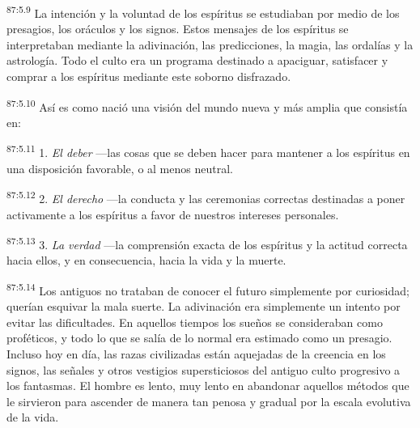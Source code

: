 \documentclass[twoside, 11pt]{book}
\begin{document}
\par
\textsuperscript{87:5.9} La intención y la voluntad de los espíritus se estudiaban por medio de los presagios, los oráculos y los signos. Estos mensajes de los espíritus se interpretaban mediante la adivinación, las predicciones, la magia, las ordalías y la astrología. Todo el culto era un programa destinado a apaciguar, satisfacer y comprar a los espíritus mediante este soborno disfrazado.

\par
\textsuperscript{87:5.10} Así es como nació una visión del mundo nueva y más amplia que consistía en:

\par
\textsuperscript{87:5.11} 1. \textit{El deber} ---las cosas que se deben hacer para mantener a los espíritus en una disposición favorable, o al menos neutral.

\par
\textsuperscript{87:5.12} 2. \textit{El derecho} ---la conducta y las ceremonias correctas destinadas a poner activamente a los espíritus a favor de nuestros intereses personales.

\par
\textsuperscript{87:5.13} 3. \textit{La verdad} ---la comprensión exacta de los espíritus y la actitud correcta hacia ellos, y en consecuencia, hacia la vida y la muerte.

\par
\textsuperscript{87:5.14} Los antiguos no trataban de conocer el futuro simplemente por curiosidad; querían esquivar la mala suerte. La adivinación era simplemente un intento por evitar las dificultades. En aquellos tiempos los sueños se consideraban como proféticos, y todo lo que se salía de lo normal era estimado como un presagio. Incluso hoy en día, las razas civilizadas están aquejadas de la creencia en los signos, las señales y otros vestigios supersticiosos del antiguo culto progresivo a los fantasmas. El hombre es lento, muy lento en abandonar aquellos métodos que le sirvieron para ascender de manera tan penosa y gradual por la escala evolutiva de la vida.
\end{document}
